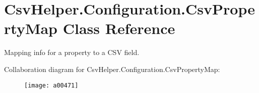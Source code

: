 \hypertarget{a00060}{\section{Csv\-Helper.\-Configuration.\-Csv\-Property\-Map Class Reference}
\label{a00060}
}


Mapping info for a property to a C\-S\-V field.  




Collaboration diagram for Csv\-Helper.\-Configuration.\-Csv\-Property\-Map\-:
\nopagebreak
\begin{figure}[H]
\begin{center}
\leavevmode
\texttt{[image: a00471]}
\end{center}
\end{figure}
